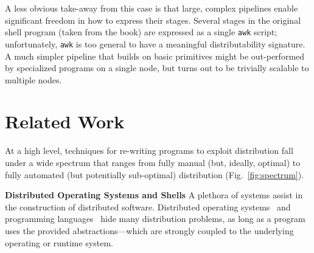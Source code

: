 \documentclass[sigplan,10pt,review,anonymous]{acmart}
\newcommand{\heading}[1]{\vspace{4pt}\noindent\textbf{#1}\enspace}
\newcommand{\ttt}[1]{\texttt{\small #1}}
\begin{document}


A less obvious take-away from this case is that large, complex pipelines enable significant freedom in how to express their stages.
Several stages in the original shell program (taken from the book) are expressed as a single \ttt{awk} script;
  unfortunately, \ttt{awk} is too general to have a meaningful distributability signature.
A much simpler pipeline that builds on basic \unix primitives might be out-performed by specialized programs on a single node, but turns out to be  trivially scalable to multiple nodes.


% 


\section{Related Work}
\label{related}

At a high level, techniques for re-writing programs to exploit distribution fall under a wide spectrum that ranges from
  fully manual (but, ideally, optimal) to 
  fully automated (but potentially sub-optimal) distribution   (Fig.~\ref{fig:spectrum}).

\heading{Distributed Operating Systems and Shells}
A plethora of systems assist in the construction of distributed software.
Distributed operating systems~\cite{ousterhout1988sprite, mullender1990amoeba, pike1990plan9, barak1998mosix} and programming languages~\cite{erlang:96, acute:05, mace:07, cloudhaskell:11}
hide many distribution problems, as long as a program uses the provided abstractions---which are strongly coupled to the underlying operating or runtime system.
\end{document}
